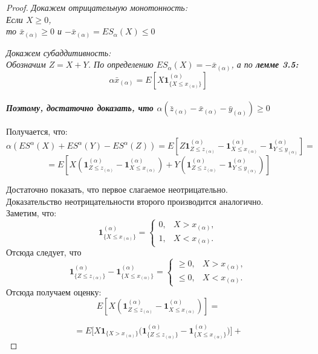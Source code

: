 \documentclass[18pt,a4paper]{article}
\theoremstyle{plain}
\theoremstyle{definition}
\begin{document}
\begin{proof}

\hspace{20pt} \it Докажем отрицательную монотонность:\rm\\
Если $X \ge 0$,\\
то $\bar{x}_{(\alpha)} \ge 0$ и $-\bar{x}_{(\alpha)} = ES_\alpha(X) \le 0$


\hspace{20pt} \it Докажем субаддитивность:\rm\\

Обозначим $Z = X+Y$.
По определению $ES_\alpha (X) = -\bar{x}_{(\alpha)}$, а по \bf{лемме 3.5: }\rm $$\alpha\bar{x}_{(\alpha)} = E[X \mathbf{1}^{(\alpha)}_{\{X \le x_{(\alpha)}  \}}]$$\\
Поэтому, достаточно доказать, что $\alpha(\bar{z}_{(\alpha)} - \bar{x}_{(\alpha)} - \bar{y}_{(\alpha)}) \ge 0$

Получается, что:
$$
\alpha(ES^\alpha(X)+ES^\alpha(Y)-ES^\alpha(Z)) = E[Z\mathbf{1}^{(\alpha)}_{Z\le z_{(\alpha)}}-\mathbf{1}^{(\alpha)}_{X\le x_{(\alpha)}}-\mathbf{1}^{(\alpha)}_{Y\le y_{(\alpha)}}]=
$$
$$
= E[X(\mathbf{1}^{(\alpha)}_{Z\le z_{(\alpha)}} - \mathbf{1}^{(\alpha)}_{X\le x_{(\alpha)}})+Y(\mathbf{1}^{(\alpha)}_{Z\le z_{(\alpha)}} - \mathbf{1}^{(\alpha)}_{Y\le y_{(\alpha)}})]
$$

Достаточно показать, что первое слагаемое неотрицательно.\\
Доказательство неотрицательности второго производится аналогично.\\
Заметим, что:\\
$$
\mathbf{1}^{(\alpha)}_{\{X \le x_{(\alpha)}  \}}=
\left\{\begin{matrix}
0, &X > x_{(\alpha)}, \\
1, &X < x_{(\alpha)}.
\end{matrix}\right.
$$
Отсюда следует, что
$$
\mathbf{1}^{(\alpha)}_{\{Z \le z_{(\alpha)}  \}} - \mathbf{1}^{(\alpha)}_{\{X \le x_{(\alpha)}  \}}=
\left\{\begin{matrix}
\ge 0, &X > x_{(\alpha)}, \\
\le 0, &X < x_{(\alpha)}.
\end{matrix}\right.
$$
Отсюда получаем оценку:\\
$$
E[X(\mathbf{1}^{(\alpha)}_{Z\le z_{(\alpha)}} - \mathbf{1}^{(\alpha)}_{X\le x_{(\alpha)}})] =
$$

$$
=E\Big[X\mathbf{1}_{\{X > x_{(\alpha)}\}}\big(\mathbf{1}^{(\alpha)}_{\{Z \le z_{(\alpha)}  \}} - \mathbf{1}^{(\alpha)}_{\{X \le x_{(\alpha)}  \}}  \big) \Big]+
$$


\end{proof}
\end{document}
